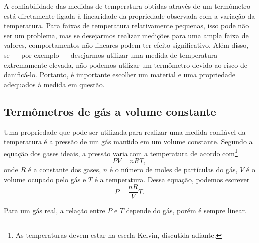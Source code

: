 A confiabilidade das medidas de temperatura obtidas através de um termômetro está diretamente ligada à linearidade da propriedade observada com a variação da temperatura. Para faixas de temperatura relativamente pequenas, isso pode não ser um problema, mas se desejarmos realizar medições para uma ampla faixa de valores, comportamentos não-lineares podem ter efeito significativo. Além disso, se --- por exemplo --- desejarmos utilizar uma medida de temperatura extremamente elevada, não podemos utilizar um termômetro devido ao risco de danificá-lo. Portanto, é importante escolher um material e uma propriedade adequados à medida em questão.

\subsection{Termômetros de gás a volume constante}

Uma propriedade que pode ser utilizada para realizar uma medida confiável da temperatura é a pressão de um gás mantido em um volume constante. Segundo a equação dos gases ideais, a pressão varia com a temperatura de acordo com\footnote[][-1cm]{As temperaturas devem estar na escala Kelvin, discutida adiante.}
\begin{equation}
	PV = nRT,
\end{equation}
%
onde $R$ é a constante dos gases, $n$ é o número de moles de partículas do gás, $V$ é o volume ocupado pelo gás e $T$ é a temperatura. Dessa equação, podemos escrever
\begin{equation}\label{Eq:PvsT}
	P = \frac{nR}{V} T.
\end{equation}

\begin{marginfigure}
\centering
{}
\caption{Para um gás real, a relação entre $P$ e $T$ depende do gás, porém é sempre linear.}
\end{marginfigure}

